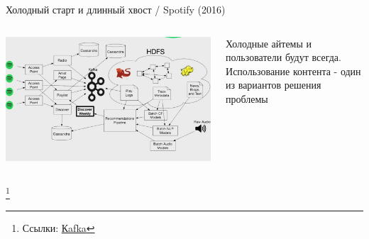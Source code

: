 \documentclass[11pt,aspectratio=169,handout]{beamer}
\begin{document}
\begin{frame}{Холодный старт и длинный хвост / Spotify (2016) \cite{SPTF}}
\begin{columns}
\begin{column}{0.6\textwidth}
   \begin{center}
		\includegraphics[scale=0.31]{images/spotify.jpeg}
   \end{center}
\end{column}
\begin{column}{0.35\textwidth}
\begin{small}
    \begin{tcolorbox}[colback=info!5,colframe=info!80,title=]
    Холодные айтемы и пользователи будут всегда. Использование контента - один из вариантов решения проблемы
    \end{tcolorbox}
\end{small}
\end{column}
\end{columns}

\footnote{Ссылки:
\href{https://kafka.apache.org/}{Кafka}
}

\end{frame}
\end{document}
